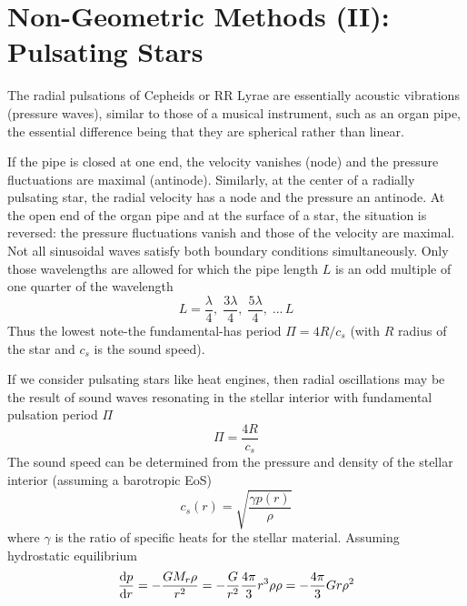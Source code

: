 \section{Non-Geometric Methods (II): Pulsating Stars}

The radial pulsations of Cepheids or RR Lyrae are essentially acoustic vibrations (pressure waves), similar to those of a musical instrument, such as an organ pipe, the essential difference being that they are spherical rather than linear.
\begin{tcolorbox}[enhanced,attach boxed title to top center={yshift=-3mm,yshifttext=-1mm},
  colback=blue!5!white,colframe=blue!75!black,colbacktitle=blue!80!black,
  title=Musical Analogy,
  boxed title style={size=small,colframe=blue!50!black}]
  If the pipe is closed at one end, the velocity vanishes (node) and the pressure fluctuations are maximal (antinode). Similarly, at the center of a radially pulsating star, the radial velocity has a node and the pressure an antinode. At the open end of the organ pipe and at the surface of a star, the situation is reversed: the pressure fluctuations vanish and those of the velocity are maximal. Not all sinusoidal waves satisfy both boundary conditions simultaneously. Only those wavelengths are allowed for which the pipe length $L$ is an odd multiple of one quarter of the wavelength
  \begin{equation*}
    L = \frac{\lambda}{4},\;\frac{3\lambda}{4},\;\frac{5\lambda}{4},\;...\,L
  \end{equation*}
  Thus the lowest note-the fundamental-has period $\Pi = 4R/c_{s}$ (with $R$ radius of the star and $c_{s}$ is the sound speed).
\end{tcolorbox}
If we consider pulsating stars like heat engines, then radial oscillations may be the result of sound waves resonating in the stellar interior with fundamental pulsation period $\Pi$
\begin{equation*}
    \Pi = \frac{4R}{c_{s}}
\end{equation*}
The sound speed can be determined from the pressure and density of the stellar interior (assuming a barotropic EoS)
\begin{equation*}
    c_{s}(r) = \sqrt{\frac{\gamma p(r)}{\rho}}
\end{equation*}
where $\gamma $ is the ratio of specific heats for the stellar material. Assuming hydrostatic equilibrium
\begin{equation*}
    \frac{\text{d}p}{\text{d}r} = -\frac{GM_{r}\rho}{r^{2}} = -\frac{G}{r^{2}}\frac{4\pi}{3}r^{3}\rho \rho = -\frac{4\pi}{3}Gr\rho^{2}
\end{equation*}
